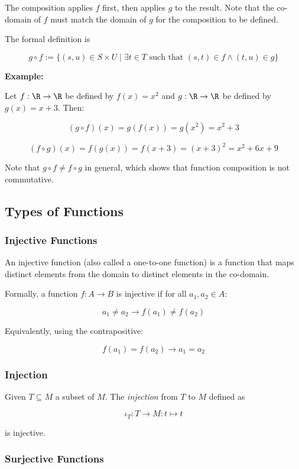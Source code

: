 The composition applies \(f\) first, then applies \(g\) to the result. 
Note that the co-domain of \(f\) must match the domain of \(g\) for the composition to be defined.

The formal definition is 

\[
	g \circ f := \{ (s, u) \in S \times U \mid \exists t \in T \text{ such that } (s, t) \in f \land (t, u) \in g \}
\]

\textbf{Example:}

Let \(f: \R \to \R\) be defined by \(f(x) = x^2\) and \(g: \R \rightarrow \R\) be defined 
by \(g(x) = x+3\). Then:

\[
	(g \circ f)(x) = g(f(x)) = g(x^2) = x^2 + 3
\]

\[
	(f \circ g)(x) = f(g(x)) = f(x+3) = {(x+3)}^2 = x^2 + 6x + 9
\]

Note that \(g \circ f \neq f \circ g\) in general, which shows that function composition is not 
commutative.

\subsection{Types of Functions}

\subsubsection{Injective Functions}

An injective function (also called a one-to-one function) is a 
function that maps distinct elements from the domain to distinct elements in the co-domain.

Formally, a function \(f: A \to B\) is injective if for all \(a_1, a_2 \in A\):

\[
	a_1 \neq a_2 \to f(a_1) \neq f(a_2)
\]

Equivalently, using the contrapositive:

\[
	f(a_1) = f(a_2) \to a_1 = a_2
\]

\subsubsection{Injection}

Given  \(T \subseteq M\) a subset of \(M\). The \emph{injection} from \(T\) to \(M\) defined as 

\[
	\iota_{T}: T \to M : t \mapsto t
\]

is injective.

\subsubsection{Surjective Functions}

